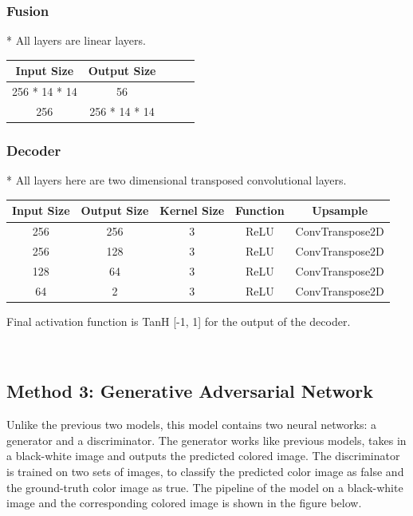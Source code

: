 \documentclass{article}
\begin{document}
\subsubsection{Fusion}

* All layers are linear layers.

\begin{center}
\begin{tabular}{ |c|c|c|c|c| } 
\hline
Input Size & Output Size  \\
\hline
256 * 14 * 14 & 56 \\ 
256 & 256 * 14 * 14 \\ 

\hline
\end{tabular}
\end{center}

\subsubsection{Decoder}

* All layers here are two dimensional transposed convolutional layers.

\begin{center}
\begin{tabular}{ |c|c|c|c|c| } 
\hline
Input Size & Output Size & Kernel Size & Function & Upsample \\
\hline
256 & 256 & 3 & ReLU & ConvTranspose2D \\ 
256 & 128 & 3 & ReLU & ConvTranspose2D \\ 
128 & 64 & 3 & ReLU &  ConvTranspose2D \\ 
64 & 2 & 3 & ReLU & ConvTranspose2D \\ 
\hline
\end{tabular}
\end{center}

Final activation function is TanH [-1, 1] for the output of the decoder.

\


\subsection{Method 3: Generative Adversarial Network}
Unlike the previous two models, this model contains two neural networks: a generator and a discriminator. 
The generator works like previous models, takes in a black-white image and outputs the predicted colored image.
The discriminator is trained on two sets of images, to classify the predicted color image as false and the ground-truth color image as true. 
The pipeline of the model on a black-white image and the corresponding colored image is shown in the figure below.
\end{document}
